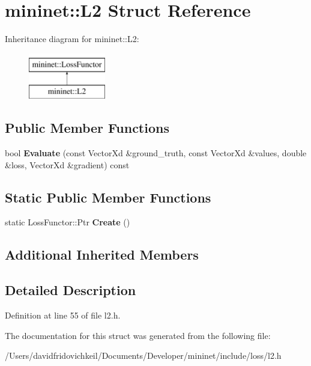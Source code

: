 \hypertarget{structmininet_1_1_l2}{}\section{mininet\+:\+:L2 Struct Reference}
\label{structmininet_1_1_l2}
Inheritance diagram for mininet\+:\+:L2\+:\begin{figure}[H]
\begin{center}
\leavevmode
\includegraphics[height=2.000000cm]{structmininet_1_1_l2}
\end{center}
\end{figure}
\subsection*{Public Member Functions}
\begin{DoxyCompactItemize}
\item 
\hypertarget{structmininet_1_1_l2_af04bc43e9158911180df165135a65a75}{}\label{structmininet_1_1_l2_af04bc43e9158911180df165135a65a75} 
bool {\bfseries Evaluate} (const Vector\+Xd \&ground\+\_\+truth, const Vector\+Xd \&values, double \&loss, Vector\+Xd \&gradient) const
\end{DoxyCompactItemize}
\subsection*{Static Public Member Functions}
\begin{DoxyCompactItemize}
\item 
\hypertarget{structmininet_1_1_l2_a54374267ff6af933a5b7dff86761b8cb}{}\label{structmininet_1_1_l2_a54374267ff6af933a5b7dff86761b8cb} 
static Loss\+Functor\+::\+Ptr {\bfseries Create} ()
\end{DoxyCompactItemize}
\subsection*{Additional Inherited Members}


\subsection{Detailed Description}


Definition at line 55 of file l2.\+h.



The documentation for this struct was generated from the following file\+:\begin{DoxyCompactItemize}
\item 
/\+Users/davidfridovichkeil/\+Documents/\+Developer/mininet/include/loss/l2.\+h\end{DoxyCompactItemize}
